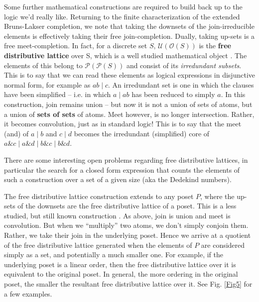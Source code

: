 \documentclass[hoptionsi,review,screen,format=sigconf]{acmart}
\theoremstyle{definition}
\newcommand{\Oc}{\mathcal{O}}
\newcommand{\Pc}{\mathcal{P}}
\newcommand{\Ucc}{\mathcal{U}}
\newcommand{\band}{\mathop{\&}}
\newcommand{\bor}{\mathop{|}}
\begin{document}
Some further mathematical constructions are required to build back up to the logic we'd really like. Returning to the finite characterization of the extended Bruns-Lakser completion, we note that taking the downsets of the join-irreducible elements is effectively taking their free join-completion. Dually, taking up-sets is a free meet-completion. In fact, for a discrete set \(S\), \(\Ucc(\Oc(S))\) is the \textbf{free distributive lattice} over S, which is a well studied mathematical object \cite{gratzer2009lattice}. The elements of this belong to \(\Pc(\Pc(S))\) and consist of its \textit{irredundant subsets}. This is to say that we can read these elements as logical expressions in disjunctive normal form, for example as \(ab \bor c\). An irredundant set is one in which the clauses have been simplified -- i.e. in which \(a \bor ab\) has been reduced to simply \(a\).  In this construction, join remains union -- but now it is not a union of sets of atoms, but a union of \textbf{sets of sets} of atoms. Meet however, is no longer intersection. Rather, it becomes convolution, just as in standard logic! This is to say that the meet (and) of \(a \bor b\) and \(c \bor d\) becomes the irredundant (simplified) core of \(a \band c \bor a \band d \bor b \band c \bor b \band d\).

There are some interesting open problems regarding free distributive lattices, in particular the search for a closed form expression that counts the elements of such a construction over a set of a given size (aka the Dedekind numbers).

The free distributive lattice construction extends to any poset \(P\), where the up-sets of the downsets are the free distributive lattice of a poset. This is a less studied, but still known construction \cite{johnstone1982stone}. As above, join is union and meet is convolution. But when we ``multiply'' two atoms, we don't simply conjoin them. Rather, we take their join in the underlying poset. Hence we arrive at a quotient of the free distributive lattice generated when the elements of \(P\) are considered simply as a set, and potentially a much smaller one. For example, if the underlying poset is a linear order, then the free distributive lattice over it is equivalent to the original poset. In general, the more ordering in the original poset, the smaller the resultant free distributive lattice over it. See Fig. \ref{Fig5} for a few examples.
\end{document}
